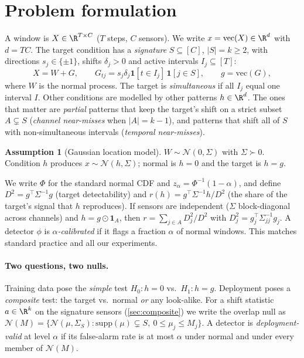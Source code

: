 \documentclass{article}
\theoremstyle{definition}
\newtheorem{assumption}{Assumption}
\theoremstyle{remark}
\renewcommand{\1}{\mathbf{1}}
\newcommand{\cN}{\mathcal{N}}
\begin{document}
\section{Problem formulation}
\label{sec:setup}
A window is $X\in\R^{T\times C}$ ($T$ steps, $C$ sensors). We write $x=\mathrm{vec}(X)\in\R^{d}$ with $d=TC$. The target condition has a \emph{signature} $S\subseteq[C]$, $|S|=k\ge2$, with directions $s_j\in\{\pm1\}$, shifts $\delta_j>0$ and active intervals $I_j\subseteq[T]$:
\begin{equation}
X = W + G,\qquad G_{tj}=s_j\delta_j\1[t\in I_j]\,\1[j\in S],\qquad g=\mathrm{vec}(G),
\label{eq:model}
\end{equation}
where $W$ is the normal process. The target is \emph{simultaneous} if all $I_j$ equal one interval $I$. Other conditions are modelled by other patterns $h\in\R^d$. The ones that matter are \emph{partial} patterns that keep the target's shift on a strict subset $A\subsetneq S$ (\emph{channel near-misses} when $|A|=k-1$), and patterns that shift all of $S$ with non-simultaneous intervals (\emph{temporal near-misses}).

\begin{assumption}[Gaussian location model]\label{ass:gauss}
$W\sim\cN(0,\Sigma)$ with $\Sigma\succ0$. Condition $h$ produces $x\sim\cN(h,\Sigma)$; normal is $h=0$ and the target is $h=g$.
\end{assumption}

We write $\Phi$ for the standard normal CDF and $z_\alpha=\Phi^{-1}(1-\alpha)$, and define
$D^2=g^\top\Sigma^{-1}g$ (target detectability) and $r(h)=g^\top\Sigma^{-1}h/D^2$ (the share of the target's signal that $h$ reproduces). If sensors are independent ($\Sigma$ block-diagonal across channels) and $h=g\odot\1_A$, then $r=\sum_{j\in A}D_j^2/D^2$ with $D_j^2=g_j^\top\Sigma_{jj}^{-1}g_j$. A detector $\phi$ is \emph{$\alpha$-calibrated} if it flags a fraction $\alpha$ of normal windows. This matches standard practice and all our experiments.

\paragraph{Two questions, two nulls.} Training data pose the \emph{simple} test $H_0\!:\!h=0$ vs.\ $H_1\!:\!h=g$. Deployment poses a \emph{composite} test: the target vs.\ normal \emph{or} any look-alike. For a shift statistic $a\in\R^k$ on the signature sensors (\cref{sec:composite}) we write the overlap null as $\mathcal{N}(M)=\{\cN(\mu,\Sigma_S):\mathrm{supp}(\mu)\subsetneq S,\ 0\le\mu_j\le M_j\}$. A detector is \emph{deployment-valid} at level $\alpha$ if its false-alarm rate is at most $\alpha$ under normal and under every member of $\mathcal{N}(M)$.
\end{document}
